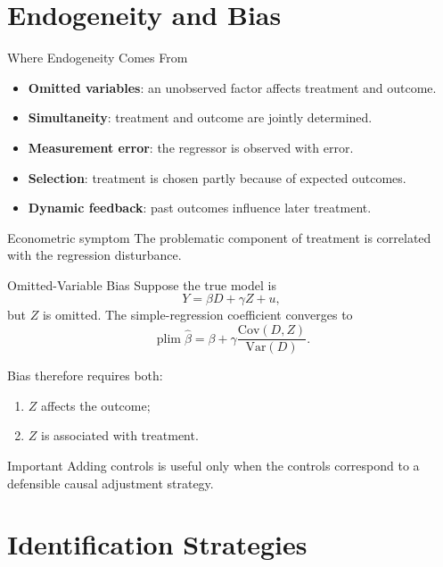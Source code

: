 \documentclass[aspectratio=169,11pt]{beamer}
\newcommand{\Var}{\mathrm{Var}}
\newcommand{\Cov}{\mathrm{Cov}}
\newcommand{\plim}{\operatorname{plim}}
\begin{document}
\section{Endogeneity and Bias}

\begin{frame}{Where Endogeneity Comes From}
\begin{itemize}
\item \textbf{Omitted variables}: an unobserved factor affects treatment and outcome.
\item \textbf{Simultaneity}: treatment and outcome are jointly determined.
\item \textbf{Measurement error}: the regressor is observed with error.
\item \textbf{Selection}: treatment is chosen partly because of expected outcomes.
\item \textbf{Dynamic feedback}: past outcomes influence later treatment.
\end{itemize}

\begin{alertblock}{Econometric symptom}
The problematic component of treatment is correlated with the regression disturbance.
\end{alertblock}
\end{frame}

\begin{frame}{Omitted-Variable Bias}
Suppose the true model is
\[
Y=\beta D+\gamma Z+u,
\]
but \(Z\) is omitted. The simple-regression coefficient converges to
\[
\plim\widehat{\beta}
=
\beta+\gamma\frac{\Cov(D,Z)}{\Var(D)}.
\]

Bias therefore requires both:
\begin{enumerate}
\item \(Z\) affects the outcome;
\item \(Z\) is associated with treatment.
\end{enumerate}

\begin{block}{Important}
Adding controls is useful only when the controls correspond to a defensible causal adjustment strategy.
\end{block}
\end{frame}

\section{Identification Strategies}
\end{document}
